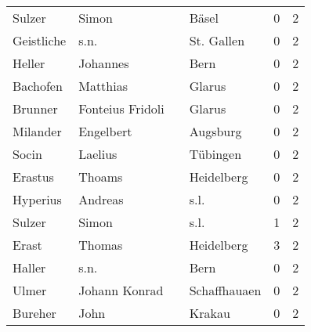 \begin{tabular}{llllrr}
                   Sulzer &                              Simon &             &                                       Bäsel &          0 &         2 \\
               Geistliche &                               s.n. &             &                                  St. Gallen &          0 &         2 \\
                   Heller &                           Johannes &             &                                        Bern &          0 &         2 \\
                 Bachofen &                           Matthias &             &                                      Glarus &          0 &         2 \\
                  Brunner &                   Fonteius Fridoli &             &                                      Glarus &          0 &         2 \\
                 Milander &                          Engelbert &             &                                    Augsburg &          0 &         2 \\
                    Socin &                            Laelius &             &                                    Tübingen &          0 &         2 \\
                  Erastus &                             Thoams &             &                                  Heidelberg &          0 &         2 \\
                 Hyperius &                            Andreas &             &                                        s.l. &          0 &         2 \\
                   Sulzer &                              Simon &             &                                        s.l. &          1 &         2 \\
                    Erast &                             Thomas &             &                                  Heidelberg &          3 &         2 \\
                   Haller &                               s.n. &             &                                        Bern &          0 &         2 \\
                    Ulmer &                      Johann Konrad &             &                                Schaffhauaen &          0 &         2 \\
                  Bureher &                               John &             &                                      Krakau &          0 &         2 \\

\end{tabular}
